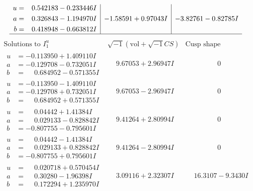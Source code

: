 \documentclass[1p]{elsarticle_modified}
\theoremstyle{definition}
\newcommand{\I}{\sqrt{-1}}
\begin{document}
$$\begin{array}{c|c|c}
\begin{aligned}
u &= \phantom{-}0.542183 - 0.233446 I \\
a &= \phantom{-}0.326843 - 1.194970 I \\
b &= \phantom{-}0.418948 - 0.663812 I\end{aligned}
 & -1.58591 + 0.97043 I & -3.82761 - 0.82785 I\\
 \hline 
 \end{array}$$\newpage$$\begin{array}{c|c|c}  
\text{Solutions to }I^u_{1}& \I (\text{vol} + \sqrt{-1}CS) & \text{Cusp shape}\\
 \hline 
\begin{aligned}
u &= -0.113950 + 1.409110 I \\
a &= -0.129708 - 0.732051 I \\
b &= \phantom{-}0.684952 - 0.571355 I\end{aligned}
 & \phantom{-}9.67053 + 2.96947 I & \phantom{-0.000000 } 0 \\ \hline\begin{aligned}
u &= -0.113950 - 1.409110 I \\
a &= -0.129708 + 0.732051 I \\
b &= \phantom{-}0.684952 + 0.571355 I\end{aligned}
 & \phantom{-}9.67053 - 2.96947 I & \phantom{-0.000000 } 0 \\ \hline\begin{aligned}
u &= \phantom{-}0.04442 + 1.41384 I \\
a &= \phantom{-}0.029133 - 0.828842 I \\
b &= -0.807755 - 0.795601 I\end{aligned}
 & \phantom{-}9.41264 + 2.80994 I & \phantom{-0.000000 } 0 \\ \hline\begin{aligned}
u &= \phantom{-}0.04442 - 1.41384 I \\
a &= \phantom{-}0.029133 + 0.828842 I \\
b &= -0.807755 + 0.795601 I\end{aligned}
 & \phantom{-}9.41264 - 2.80994 I & \phantom{-0.000000 } 0 \\ \hline\begin{aligned}
u &= \phantom{-}0.020718 + 0.570454 I \\
a &= \phantom{-}0.30280 - 1.96398 I \\
b &= \phantom{-}0.172294 + 1.235970 I\end{aligned}
 & \phantom{-}3.09116 + 2.32307 I & \phantom{-}16.3107 - 9.3430 I \\ \hline\begin{aligned}

\end{aligned}
\end{array}$$
\end{document}
